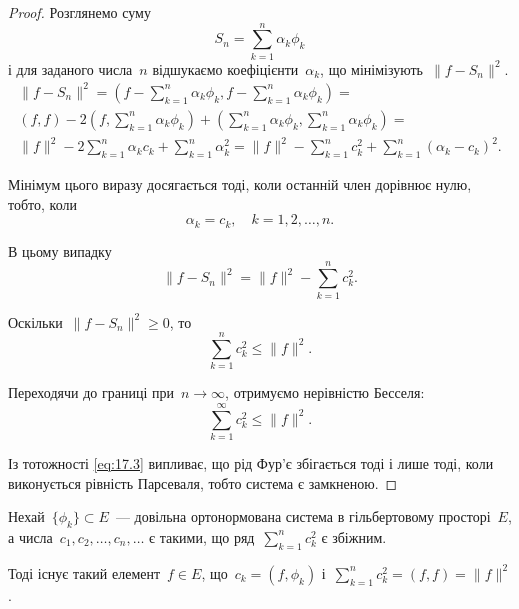 \begin{proof}
    Розглянемо суму
    \begin{equation*}
        S_n = \sum_{k = 1}^n \alpha_k \phi_k
    \end{equation*}
    і для заданого числа~$n$ відшукаємо коефіцієнти~$\alpha_k$, що мінімізують~$\|f - S_n\|^2$.
    \begin{multline*}
        \|f - S_n\|^2 =
        \left( f - \sum_{k = 1}^n \alpha_k \phi_k, f - \sum_{k = 1}^n \alpha_k \phi_k \right) = \\
        (f, f) - 2 \left( f, \sum_{k = 1}^n \alpha_k \phi_k \right) + \left( \sum_{k = 1}^n \alpha_k \phi_k, \sum_{k = 1}^n \alpha_k \phi_k \right) = \\
        \|f\|^2 - 2 \sum_{k = 1}^n \alpha_k c_k + \sum_{k = 1}^n \alpha_k^2 =
        \|f\|^2 - \sum_{k = 1}^n c_k^2 + \sum_{k = 1}^n (\alpha_k - c_k)^2.
    \end{multline*}

    Мінімум цього виразу досягається тоді, коли останній член дорівнює нулю, тобто, коли
    \begin{equation*}
        \alpha_k = c_k, \quad k = 1, 2, \dots, n.
    \end{equation*}
    
    В цьому випадку
    \begin{equation}
        \label{eq:17.3}
        \|f - S_n\|^2 = \|f\|^2 - \sum_{k = 1}^n c_k^2.
    \end{equation}
    
    Оскільки~$\|f - S_n\|^2 \ge 0$, то
    \begin{equation*}
        \sum_{k = 1}^n c_k^2 \le \|f\|^2.
    \end{equation*}
    
    Переходячи до границі при~$n \to \infty$, отримуємо нерівністю Бесселя:
    \begin{equation*}
        \sum_{k = 1}^\infty c_k^2 \le \|f\|^2.
    \end{equation*}

    Із тотожності \eqref{eq:17.3} випливає, що рід Фур'є збігається тоді і лише тоді, коли виконується рівність Парсеваля, тобто система є замкненою. 
\end{proof}

\begin{theorem}
    Нехай~$\{\phi_k\} \subset E$~--- довільна ортонормована система в гільбертовому просторі~$E$, а числа~$c_1, c_2, \dots, c_n, \dots$ є такими, що ряд~$\sum_{k = 1}^n c_k^2$ є збіжним.

    Тоді існує такий елемент~$f \in E$, що~$c_k = (f, \phi_k)$ і~$\sum_{k = 1}^n c_k^2 = (f, f) = \|f\|^2$.
\end{theorem}

